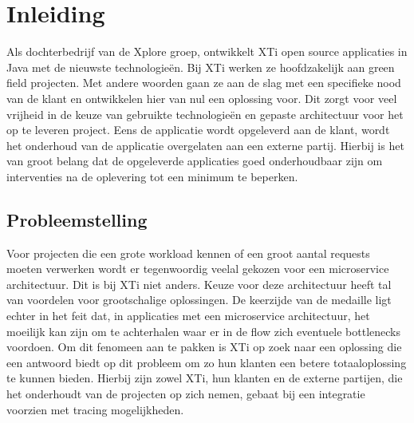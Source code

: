 
\chapter{Inleiding}
\label{ch:inleiding}
Als dochterbedrijf van de Xplore groep, ontwikkelt XTi open source applicaties in Java met de nieuwste technologieën. Bij XTi werken ze hoofdzakelijk aan green field projecten. Met andere woorden gaan ze aan de slag met een specifieke nood van de klant en ontwikkelen hier van nul een oplossing voor. Dit zorgt voor veel vrijheid in de keuze van gebruikte technologieën en gepaste architectuur voor het op te leveren project. Eens de applicatie wordt opgeleverd aan de klant, wordt het onderhoud van de applicatie overgelaten aan een externe partij. Hierbij is het van groot belang dat de opgeleverde applicaties goed onderhoudbaar zijn om interventies na de oplevering tot een minimum te beperken.

\section{Probleemstelling}
\label{sec:probleemstelling}
Voor projecten die een grote workload kennen of een groot aantal requests moeten verwerken wordt er tegenwoordig veelal gekozen voor een microservice architectuur. Dit is bij XTi niet anders. Keuze voor deze architectuur heeft tal van voordelen voor grootschalige oplossingen. De keerzijde van de medaille ligt echter in het feit dat, in applicaties met een microservice architectuur, het moeilijk kan zijn om te achterhalen waar er in de flow zich eventuele bottlenecks voordoen. Om dit fenomeen aan te pakken is XTi op zoek naar een oplossing die een antwoord biedt op dit probleem om zo hun klanten een betere totaaloplossing te kunnen bieden. Hierbij zijn zowel XTi, hun klanten en de externe partijen, die het onderhoudt van de projecten op zich nemen, gebaat bij een integratie voorzien met tracing mogelijkheden.

